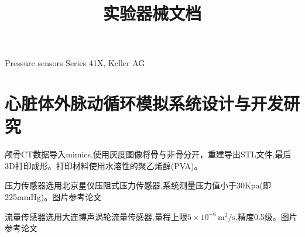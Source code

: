\documentclass[titlepage,12pt]{article}
\title{实验器械文档}
\begin{document}
\maketitle

Pressure sensors Series 41X, Keller AG

\section{心脏体外脉动循环模拟系统设计与开发研究}
颅骨CT数据导入mimics,使用灰度图像将骨与非骨分开，重建导出STL文件,最后3D打印成形。打印材料使用水溶性的聚乙烯醇(PVA)。

压力传感器选用北京星仪压阻式压力传感器,系统测量压力值小于30Kpa(即225mmHg)。图片参考论文

流量传感器选用大连博声涡轮流量传感器,量程上限$5\times10^{-6} \, \text{m}^2/\text{s}$,精度0.5级。图片参考论文
\end{document}
